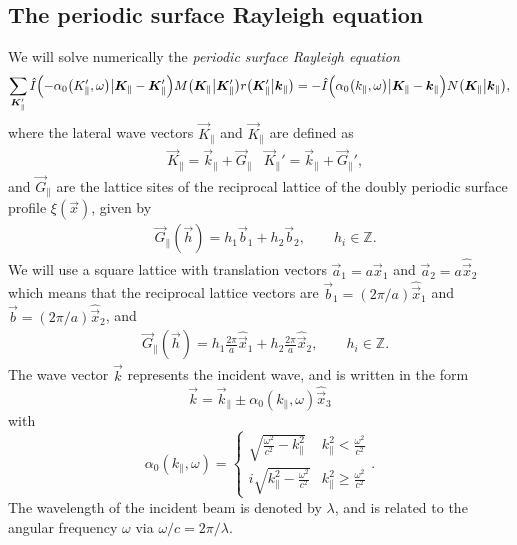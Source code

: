 \subsection*{The periodic surface Rayleigh equation}
We will solve numerically the \emph{periodic surface Rayleigh equation}
\begin{equation}
    \sum_{\vec K_{\|}'} \hat I\del[2]{-\alpha_0 \del[1]{K_{\|}', \omega} \big\vert \vec K_{\|} - \vec K_{\|}'} M\del[1]{\vec K_{\|} \big\vert \vec K_{\|}'} r\del[1]{\vec K_{\|}' \big\vert \vec k_{\|}} 
    = -\hat I \del[2]{\alpha_0 \del[1]{k_{\|}, \omega} \big\vert \vec K_{\|} - \vec k_{\|}} N\del[1]{\vec K_{\|} \big\vert \vec k_{\|}},
    \label{eq:rayleigh}
\end{equation}
where the lateral wave vectors $\vec K_{\|}$ and $\vec K_{\|}$ are defined as
\begin{align}
    &\vec K_{\|} = \vec k_{\|} + \vec G_{\|} &\vec K_{\|}' = \vec k_{\|} + \vec G_{\|}',
\end{align}
and $\vec G_{\|}$ are the lattice sites of the reciprocal lattice of the doubly periodic surface profile $\xi(\vec x)$, given by
\begin{align}
    &\vec G_{\|} (\vec h) = h_1 \vec b_1 + h_2 \vec b_2, \qquad h_i \in \mathbb{Z}.
\end{align}
We will use a square lattice with translation vectors $\vec a_1 = a \hat {\vec x}_1$ and $\vec a_2 = a\hat{\vec x}_2$ which means that the reciprocal lattice vectors are $\vec b_1 = (2\pi/a)\hat{\vec x}_1$ and $\vec b=(2\pi/a)\hat{\vec x}_2$, and
\begin{align}
    &\vec G_{\|} (\vec h) = h_1 \frac{2\pi}{a} \hat{\vec x}_1 + h_2 \frac{2\pi}{a} \hat{\vec x}_2, \qquad h_i \in \mathbb{Z}.
\end{align}
The wave vector $\vec k$ represents the incident wave, and is written in the form
\begin{equation}
    \vec k = \vec k_\| \pm \alpha_0(k_\|, \omega)\hat {\vec x}_3
\end{equation}
with
\begin{equation}
    \alpha_0(k_\|, \omega) =
    \begin{cases}
        \sqrt{\frac{\omega^2}{c^2} - k_\|^2} &k_\|^2 < \frac{\omega^2}{c^2} \\
        i\sqrt{k_\|^2 - \frac{\omega^2}{c^2}} &k_\|^2 \geq \frac{\omega^2}{c^2}
    \end{cases}.
\end{equation}
The wavelength of the incident beam is denoted by $\lambda$, and is related to the angular frequency $\omega$ via $\omega/c = 2\pi/\lambda$.

